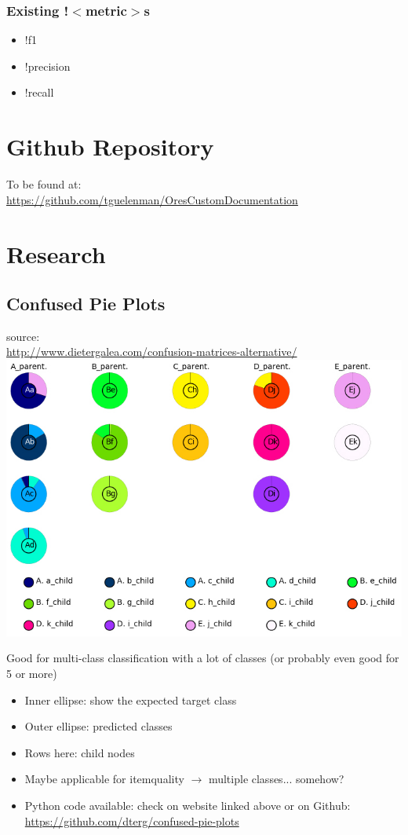 \documentclass[12pt,a4paper]{article}
\begin{document}
\subsubsection{Existing !$<$metric$>$s}
\begin{itemize}
\item !f1
\item !precision
\item !recall
\end{itemize}
\section{Github Repository}
To be found at:\\
\url{https://github.com/tguelenman/OresCustomDocumentation}

\section{Research}
\subsection{Confused Pie Plots}
source:\\
\url{http://www.dietergalea.com/confusion-matrices-alternative/}\\
\includegraphics[scale=0.6]{resources/3/confusedPiePlots}
\begin{description}
\item Good for multi-class classification with a lot of classes (or probably even good for 5 or more)
\end{description}
\begin{itemize}
\item Inner ellipse: show the expected target class
\item Outer ellipse: predicted classes
\item Rows here: child nodes
\item Maybe applicable for itemquality $\rightarrow$ multiple classes... somehow?
\item Python code available: check on website linked above or on Github:\\ \url{https://github.com/dterg/confused-pie-plots}
\end{itemize}
\end{document}
